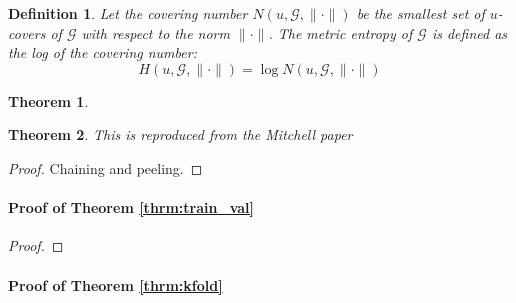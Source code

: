 \documentclass[12pt]{article}
\newtheorem{theorem}{Theorem}
\newtheorem{definition}{Definition}
\begin{document}
\begin{definition}
Let the covering number $N(u, \mathcal{G}, \| \cdot \|)$ be the smallest set of $u$-covers of $\mathcal{G}$ with respect to the norm $\| \cdot \|$. The metric entropy of $\mathcal{G}$ is defined as the log of the covering number:
\begin{equation}
H (u, \mathcal{G}, \| \cdot \| ) = \log N(u, \mathcal{G}, \| \cdot \|)
\end{equation}
\end{definition}

\begin{theorem}
\label{thrm:train_val_complicated}
\end{theorem}

\begin{theorem}
	\label{thrm:k_fold_complicated}
	This is reproduced from the Mitchell paper
\end{theorem}

\begin{proof}
Chaining and peeling.
\end{proof}


\paragraph{Proof of Theorem \ref{thrm:train_val}}

\begin{proof}

\end{proof}

\paragraph{Proof of Theorem \ref{thrm:kfold}}
\end{document}
